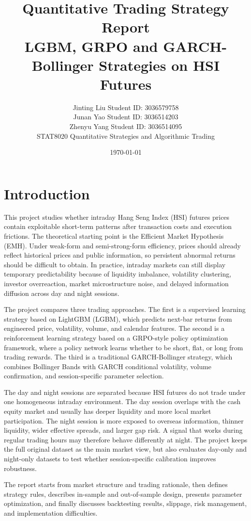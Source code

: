 \documentclass[11pt,a4paper]{article}
\title{\textbf{Quantitative Trading Strategy Report}\\
\large LGBM, GRPO and GARCH-Bollinger Strategies on HSI Futures}
\author{
\begin{tabular}{c}
Jinting Liu \quad Student ID: 3036579758 \\
Junan Yao \quad Student ID: 3036514203 \\
Zhenyu Yang \quad Student ID: 3036514095 \\
STAT8020 Quantitative Strategies and Algorithmic Trading
\end{tabular}
}
\date{\today}
\begin{document}
\maketitle
\tableofcontents
\newpage

\section{Introduction}

This project studies whether intraday Hang Seng Index (HSI) futures prices contain exploitable short-term patterns after transaction costs and execution frictions. The theoretical starting point is the Efficient Market Hypothesis (EMH). Under weak-form and semi-strong-form efficiency, prices should already reflect historical prices and public information, so persistent abnormal returns should be difficult to obtain. In practice, intraday markets can still display temporary predictability because of liquidity imbalance, volatility clustering, investor overreaction, market microstructure noise, and delayed information diffusion across day and night sessions.

The project compares three trading approaches. The first is a supervised learning strategy based on LightGBM (LGBM), which predicts next-bar returns from engineered price, volatility, volume, and calendar features. The second is a reinforcement learning strategy based on a GRPO-style policy optimization framework, where a policy network learns whether to be short, flat, or long from trading rewards. The third is a traditional GARCH-Bollinger strategy, which combines Bollinger Bands with GARCH conditional volatility, volume confirmation, and session-specific parameter selection.

The day and night sessions are separated because HSI futures do not trade under one homogeneous intraday environment. The day session overlaps with the cash equity market and usually has deeper liquidity and more local market participation. The night session is more exposed to overseas information, thinner liquidity, wider effective spreads, and larger gap risk. A signal that works during regular trading hours may therefore behave differently at night. The project keeps the full original dataset as the main market view, but also evaluates day-only and night-only datasets to test whether session-specific calibration improves robustness.

The report starts from market structure and trading rationale, then defines strategy rules, describes in-sample and out-of-sample design, presents parameter optimization, and finally discusses backtesting results, slippage, risk management, and implementation difficulties.
\end{document}

